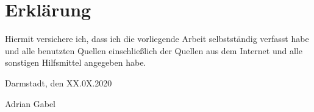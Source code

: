 \thispagestyle{empty}

\vspace*{4cm}
\section*{Erklärung}

Hiermit versichere ich, dass ich die vorliegende Arbeit selbstständig verfasst habe und alle benutzten Quellen einschließlich der Quellen aus dem Internet und alle sonstigen Hilfsmittel angegeben habe.\vspace{20pt}

\noindent
Darmstadt, den XX.0X.2020\vspace{60pt}


\noindent
Adrian Gabel


